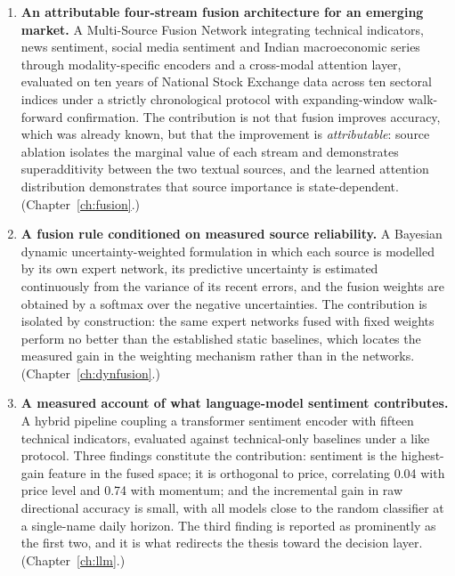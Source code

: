 \begin{enumerate}[label=\textbf{C\arabic*.},leftmargin=2.8em]
\item \textbf{An attributable four-stream fusion architecture for an emerging market.} A
Multi-Source Fusion Network integrating technical indicators, news sentiment, social media
sentiment and Indian macroeconomic series through modality-specific encoders and a
cross-modal attention layer, evaluated on ten years of National Stock Exchange data across
ten sectoral indices under a strictly chronological protocol with expanding-window
walk-forward confirmation. The contribution is not that fusion improves accuracy, which was
already known, but that the improvement is \emph{attributable}: source ablation isolates the
marginal value of each stream and demonstrates superadditivity between the two textual
sources, and the learned attention distribution demonstrates that source importance is
state-dependent. (Chapter~\ref{ch:fusion}.)

\item \textbf{A fusion rule conditioned on measured source reliability.} A Bayesian dynamic
uncertainty-weighted formulation in which each source is modelled by its own expert network,
its predictive uncertainty is estimated continuously from the variance of its recent errors,
and the fusion weights are obtained by a softmax over the negative uncertainties. The
contribution is isolated by construction: the same expert networks fused with fixed weights
perform no better than the established static baselines, which locates the measured gain in
the weighting mechanism rather than in the networks. (Chapter~\ref{ch:dynfusion}.)

\item \textbf{A measured account of what language-model sentiment contributes.} A hybrid
pipeline coupling a transformer sentiment encoder with fifteen technical indicators,
evaluated against technical-only baselines under a like protocol. Three findings constitute
the contribution: sentiment is the highest-gain feature in the fused space; it is orthogonal
to price, correlating 0.04 with price level and 0.74 with momentum; and the incremental gain
in raw directional accuracy is small, with all models close to the random classifier at a
single-name daily horizon. The third finding is reported as prominently as the first two, and
it is what redirects the thesis toward the decision layer. (Chapter~\ref{ch:llm}.)


\end{enumerate}
